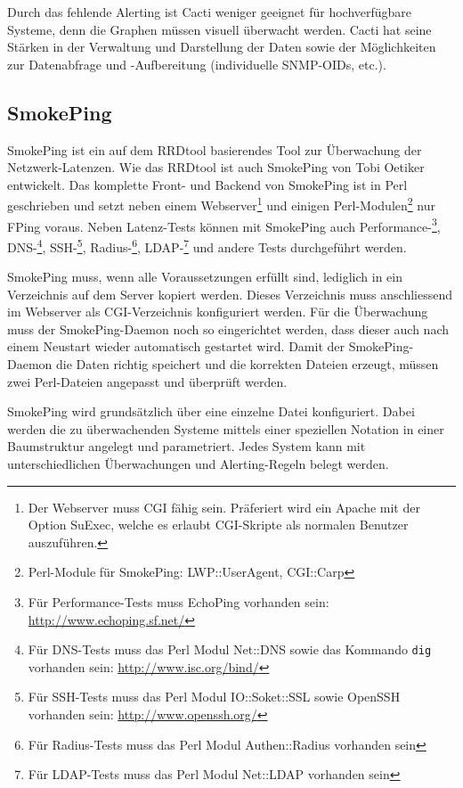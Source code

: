  Durch das fehlende Alerting ist Cacti weniger geeignet f\"ur hochverf\"ugbare Systeme, denn die Graphen m\"ussen visuell \"uberwacht werden. Cacti hat seine St\"arken in der Verwaltung und Darstellung der Daten sowie der M\"oglichkeiten zur Datenabfrage und -Aufbereitung (individuelle SNMP-OIDs, etc.).


\subsection{SmokePing} \label{sec:systeme-smoke}  
  SmokePing\cite{smokeping} ist ein auf dem RRDtool\cite{rrdtool} basierendes Tool zur \"Uberwachung der Netzwerk-Latenzen. Wie das RRDtool ist auch SmokePing von Tobi Oetiker entwickelt. Das komplette Front- und Backend von SmokePing ist in Perl geschrieben und setzt neben einem Webserver\footnote{\label{foot:apache-suexec}Der Webserver muss CGI f\"ahig sein. Pr\"aferiert wird ein Apache mit der Option SuExec, welche es erlaubt CGI-Skripte als normalen Benutzer auszuf\"uhren.} und einigen Perl-Modulen\footnote{Perl-Module f\"ur SmokePing: LWP::UserAgent, CGI::Carp} nur FPing\cite{fping} voraus. Neben Latenz-Tests k\"onnen mit SmokePing auch Performance-\footnote{F\"ur Performance-Tests muss EchoPing vorhanden sein: \url{http://www.echoping.sf.net/}}, DNS-\footnote{F\"ur DNS-Tests muss das Perl Modul Net::DNS sowie das Kommando \texttt{dig} vorhanden sein: \url{http://www.isc.org/bind/}}, SSH-\footnote{F\"ur SSH-Tests muss das Perl Modul IO::Soket::SSL sowie OpenSSH vorhanden sein: \url{http://www.openssh.org/}}, Radius-\footnote{F\"ur Radius-Tests muss das Perl Modul Authen::Radius vorhanden sein}, LDAP-\footnote{F\"ur LDAP-Tests muss das Perl Modul Net::LDAP vorhanden sein} und andere Tests durchgef\"uhrt werden.

  SmokePing muss, wenn alle Voraussetzungen erf\"ullt sind, lediglich in ein Verzeichnis auf dem Server kopiert werden. Dieses Verzeichnis muss anschliessend im Webserver als CGI-Verzeichnis konfiguriert werden. F\"ur die \"Uberwachung muss der SmokePing-Daemon noch so eingerichtet werden, dass dieser auch nach einem Neustart wieder automatisch gestartet wird. Damit der SmokePing-Daemon die Daten richtig speichert und die korrekten Dateien erzeugt, m\"ussen zwei Perl-Dateien angepasst und \"uberpr\"uft werden.

  SmokePing wird grunds\"atzlich \"uber eine einzelne Datei konfiguriert. Dabei werden die zu \"uberwachenden Systeme mittels einer speziellen Notation in einer Baumstruktur angelegt und parametriert. Jedes System kann mit unterschiedlichen \"Uberwachungen und Alerting-Regeln belegt werden.

